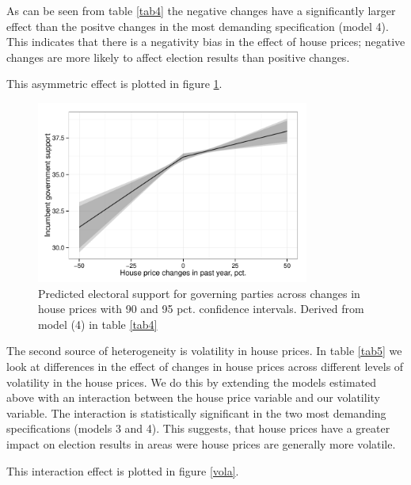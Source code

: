 \documentclass[12pt,a4paper]{article}
\begin{document}
As can be seen from table \ref{tab4} the negative changes have a significantly larger effect than the positve changes in the most demanding specification (model 4). This indicates that there is a negativity bias in the effect of house prices; negative changes are more likely to affect election results than positive changes. 



This asymmetric effect is plotted in figure \ref{posneg}.

\begin{figure}[htbp]
	\includegraphics[page=1,width=0.8\textwidth]{../figures/posnegplot}
	\centering
	\caption{Predicted electoral support for governing parties across changes in house prices with 90 and 95 pct. confidence intervals. Derived from model (4) in table \ref{tab4}}
	\label{posneg}
\end{figure}

The second source of heterogeneity is volatility in house prices. In table \ref{tab5} we look at differences in the effect of changes in house prices across different levels of volatility in the house prices.  We do this by extending the models estimated above with an interaction between the house price variable and our volatility variable. The interaction is statistically significant in the two most demanding specifications (models 3 and 4). This suggests, that house prices have a greater impact on election results in areas were house prices are generally more volatile. 



This interaction effect is plotted in figure \ref{vola}.
\end{document}
